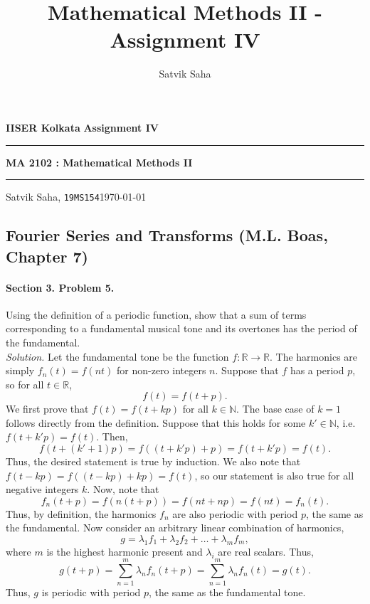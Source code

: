 \documentclass[10pt]{article}
\title{Mathematical Methods II - Assignment IV}
\author{Satvik Saha}
\date{}
\begin{document}
        \par\textbf{IISER Kolkata} \hfill \textbf{Assignment IV}
        \vspace{3pt}
        \hrule
        \vspace{3pt}
        \begin{center}
                \LARGE{\textbf{MA 2102 : Mathematical Methods II}}
        \end{center}
        \vspace{3pt}
        \hrule
        \vspace{3pt}
        Satvik Saha, \texttt{19MS154}\hfill\today
        \vspace{20pt}
        \subsection*{Fourier Series and Transforms (M.L. Boas, Chapter 7)}
        \paragraph{Section 3. Problem 5.} Using the definition of a periodic function, show that a sum of terms corresponding to a fundamental
        musical tone and its overtones has the period of the fundamental. \\

        \textit{Solution.} Let the fundamental tone be the function $f\colon \mathbb{R} \to \mathbb{R}$.
        The harmonics are simply $f_n(t) = f(nt)$ for non-zero integers $n$. Suppose that $f$ has a period $p$, so for all $t \in \mathbb{R}$,
        \[
                f(t) = f(t + p).
        \]
        We first prove that $f(t) = f(t + kp)$ for all $k \in \mathbb{N}$. The base case of $k=1$ follows directly from the definition.
        Suppose that this holds for some $k' \in \mathbb{N}$, i.e.\ $f(t + k'p) = f(t)$. Then, 
        \[
                f(t + (k' + 1)p) = f((t + k'p) + p) = f(t + k'p) = f(t).
        \]
        Thus, the desired statement is true by induction.
        We also note that $f(t - kp) = f((t - kp) + kp) = f(t)$, so our statement is also true for all negative integers $k$.
        Now, note that
        \[
                f_n(t + p) = f(n(t + p)) = f(nt + np) = f(nt) = f_n(t).
        \]
        Thus, by definition, the harmonics $f_n$ are also periodic with period $p$, the same as the fundamental.
        Now consider an arbitrary linear combination of harmonics, 
        \[
                g = \lambda_1f_1 + \lambda_2f_2 + \dots + \lambda_mf_m,
        \]
        where $m$ is the highest harmonic present and $\lambda_i$ are real scalars. Thus,
        \[
                g(t + p) = \sum_{n = 1}^m \lambda_n f_n(t + p) = \sum_{n = 1}^m \lambda_nf_n(t) = g(t).
        \]
        Thus, $g$ is periodic with period $p$, the same as the fundamental tone.
\end{document}
